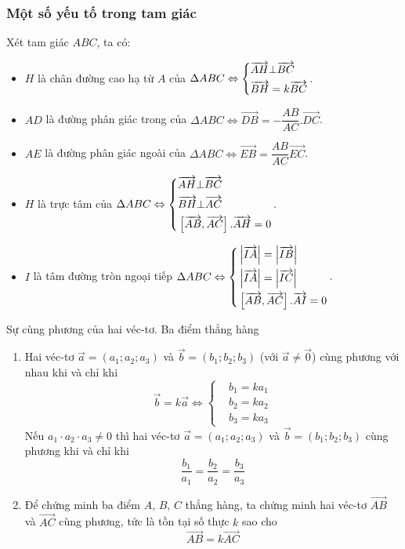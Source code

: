\subsubsection{Một số yếu tố trong tam giác}
Xét tam giác $ABC$, ta có:
	\begin{itemize}
		\item $H$ là chân đường cao hạ từ $A$ của $\Delta ABC\Leftrightarrow \left\{\begin{aligned}
			& \overrightarrow{AH}\bot \overrightarrow{BC} \\ 
			& \overrightarrow{BH}=k\overrightarrow{BC} \\ 
		\end{aligned}\right.$. 
		\item $AD$ là đường phân giác trong của $\Delta ABC\Leftrightarrow \overrightarrow{DB}=-\dfrac{AB}{AC}.\overrightarrow{DC}$. 
		\item $AE$ là đường phân giác ngoài của $\Delta ABC\Leftrightarrow \overrightarrow{EB}=\dfrac{AB}{AC}\overrightarrow{EC}$. 
		\item $H$ là trực tâm của $\Delta ABC\Leftrightarrow \left\{\begin{aligned}
			& \overrightarrow{AH}\bot \overrightarrow{BC} \\ 
			&\overrightarrow{BH}\bot \overrightarrow{AC} \\ 
			& \left[\overrightarrow{AB},\overrightarrow{AC}\right].\overrightarrow{AH}=0 \\ 
		\end{aligned}\right.$. 
		\item $I$ là tâm đường tròn ngoại tiếp $\Delta ABC\Leftrightarrow \left\{\begin{aligned}
			& \left| \overrightarrow{IA}\right|=\left| \overrightarrow{IB}\right| \\ 
			& \left| \overrightarrow{IA}\right|=\left| \overrightarrow{IC}\right| \\ 
			& \left[\overrightarrow{AB},\overrightarrow{AC}\right].\overrightarrow{AI}=0 \\ 
		\end{aligned}\right.$. 
	\end{itemize}

\begin{dang}{Sự cùng phương của hai véc-tơ. Ba điểm thẳng hàng}
	\begin{enumerate}
		\item Hai véc-tơ $\overrightarrow{a}=(a_1; a_2; a_3)$ và $\overrightarrow{b}=(b_1; b_2; b_3)$ (với  $\overrightarrow{a}\neq \overrightarrow{0}$) cùng phương với nhau khi và chỉ khi
		$$\overrightarrow{b}=k\overrightarrow{a}\Leftrightarrow{ \left\{\begin{aligned}& b_1=ka_1\\&b_2=ka_2\\&b_3=ka_3\end{aligned}\right.}$$
		Nếu $a_1\cdot a_2\cdot a_3 \neq 0$ thì  hai véc-tơ $\overrightarrow{a}=(a_1; a_2; a_3)$ và $\overrightarrow{b}=(b_1; b_2; b_3)$ cùng phương khi và chỉ khi
		$$ \dfrac{b_1}{a_1}= \dfrac{b_2}{a_2}= \dfrac{b_3}{a_3} $$
		\item Để chứng minh ba điểm $A$, $B$, $C$ thẳng hàng, ta chứng minh hai véc-tơ $ \overrightarrow{AB} $ và $ \overrightarrow{AC} $ cùng phương, tức là tồn tại số thực $k$ sao cho
		$$\overrightarrow{AB}=k\overrightarrow{AC} $$
	\end{enumerate}
\end{dang}


